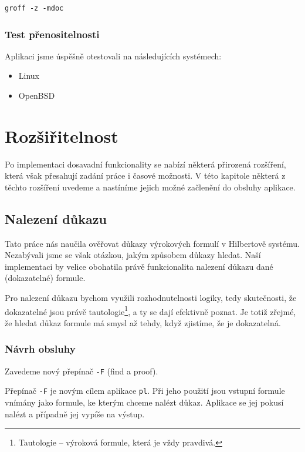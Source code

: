\documentclass[thesis=B,czech,hidelinks]{thesis}[2012/06/26]
\begin{document}
\begin{lstlisting}
groff -z -mdoc
\end{lstlisting}

\subsection{Test přenositelnosti}

Aplikaci jsme úspěšně otestovali na následujících systémech:

\begin{itemize}
	\item Linux
	\item OpenBSD
\end{itemize}

%
%
%

\chapter{Rozšiřitelnost}

Po implementaci dosavadní funkcionality se nabízí některá přirozená rozšíření, která však přesahují zadání práce i časové možnosti. V této kapitole některá z těchto rozšíření uvedeme a nastíníme jejich možné začlenění do obsluhy aplikace.

\section{Nalezení důkazu}

Tato práce nás naučila ověřovat důkazy výrokových formulí v Hilbertově systému. Nezabývali jsme se však otázkou, jakým způsobem důkazy hledat. Naší implementaci by velice obohatila právě funkcionalita nalezení důkazu dané (dokazatelné) formule.

Pro nalezení důkazu bychom využili rozhodnutelnosti logiky, tedy skutečnosti, že dokazatelné jsou právě tautologie\footnote{Tautologie -- výroková formule, která je vždy pravdivá.}, a ty se dají efektivně poznat. Je totiž zřejmé, že hledat důkaz formule má smysl až tehdy, když zjistíme, že je dokazatelná.

\subsection{Návrh obsluhy}

Zavedeme nový přepínač \texttt{-F} (find a proof).

Přepínač \texttt{-F} je novým cílem aplikace \texttt{pl}. Při jeho použití jsou vstupní formule vnímány jako formule, ke kterým chceme nalézt důkaz. Aplikace se jej pokusí nalézt a případně jej vypíše na výstup.
\end{document}
